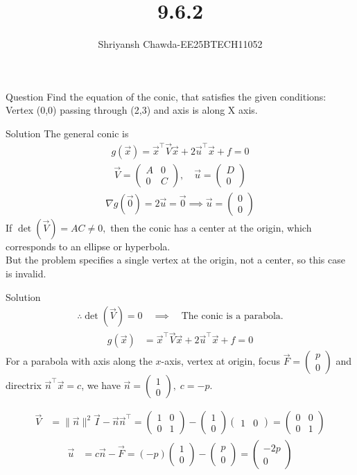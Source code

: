 \documentclass{beamer}
\title{9.6.2}
\author{Shriyansh Chawda-EE25BTECH11052}
\newcommand{\myvec}[1]{\ensuremath{\begin{pmatrix}#1\end{pmatrix}}}
\begin{document}
\frame{\titlepage}
	
\begin{frame}{Question} 
Find the equation of the conic, that satisfies the given
conditions:\\
Vertex (0,0) passing through (2,3) and axis is along X axis.
\end{frame}
	
\begin{frame}{Solution}
The general conic is 
\begin{align}
	g(\vec{x}) = \vec{x}^\top \vec{V}\vec{x} + 2\vec{u}^\top \vec{x} + f = 0
\end{align}
\begin{align}
	\vec{V} = \myvec{A & 0 \\ 0 & C}, \quad 
	\vec{u} = \myvec{D \\ 0}
\end{align}
\begin{align}
	\nabla g(\vec{0}) = 2\vec{u} = \vec{0} 
	\implies \vec{u} = \myvec{0 \\ 0}
\end{align}
If $ \det(\vec{V}) = AC \neq 0,$ then the conic has a center at the origin, which corresponds to an ellipse or hyperbola.\\
But the problem specifies a single vertex at the origin, not a center, so this case is invalid.
\end{frame}



\begin{frame}{Solution}
\begin{align}
	\therefore \det(\vec{V}) = 0 \quad \implies \quad \text{The conic is a parabola.}
\end{align}
\begin{align}
	g(\vec{x}) &= \vec{x}^\top \vec{V}\vec{x} + 2\vec{u}^\top \vec{x} + f = 0 
\end{align}
For a parabola with axis along the $x$-axis, vertex at origin,  
focus $\vec{F} = \myvec{p \\ 0}$ and directrix $\vec{n}^\top \vec{x} = c$,  
we have $\vec{n} = \myvec{1 \\ 0}, \; c = -p$.

\begin{align}
	\vec{V} &= \|\vec{n}\|^2 \vec{I} - \vec{n}\vec{n}^\top 
	= \myvec{1 & 0 \\ 0 & 1} - \myvec{1 \\ 0}\myvec{1 & 0} 
	= \myvec{0 & 0 \\ 0 & 1}
\end{align}
\begin{align}
	\vec{u} &= c\vec{n} - \vec{F} 
	= (-p)\myvec{1 \\ 0} - \myvec{p \\ 0} 
	= \myvec{-2p \\ 0}
\end{align}	
\end{frame}
\end{document}
